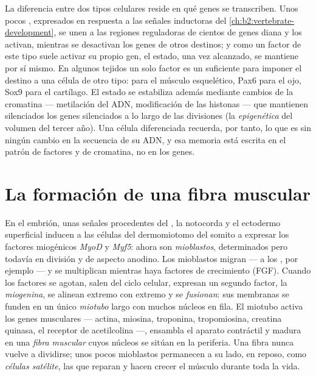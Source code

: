 \begin{proposition}\label{prop:b2:cell-differentiation:transcriptional}
La diferencia entre dos tipos celulares reside en qué genes se
transcriben. Unos pocos \emph{}, expresados en
respuesta a las señales inductoras del
\cref{ch:b2:vertebrate-development}, se unen a las regiones reguladoras de
cientos de genes diana y los activan, mientras se desactivan los genes de
otros destinos; y como un factor de este tipo suele activar su propio gen,
el estado, una vez alcanzado, se mantiene por sí mismo. En algunos tejidos
un solo factor es un \emph{} suficiente para imponer el
destino a una célula de otro tipo:  para el músculo esquelético, Pax6
para el ojo, Sox9 para el cartílago. El estado se estabiliza además
mediante cambios de la cromatina --- metilación del ADN, modificación de
las histonas --- que mantienen silenciados los genes silenciados a lo largo
de las divisiones (la \emph{epigenética} del volumen del tercer año). Una
célula diferenciada recuerda, por tanto, lo que es sin ningún cambio en la
secuencia de su ADN, y esa memoria está escrita en el patrón de factores y
de cromatina, no en los genes.
\end{proposition}

\section{La formación de una fibra muscular}

\begin{definition}[Miogénesis]\label{def:b2:cell-differentiation:myogenesis}
En el embrión, unas señales procedentes del , la notocorda y el
ectodermo superficial inducen a las células del dermomiotomo del somito a
expresar los factores miogénicos \emph{MyoD} y \emph{Myf5}: ahora son
\emph{mioblastos}, determinados pero todavía en división y de aspecto
anodino. Los mioblastos migran --- a los , por
ejemplo --- y se multiplican mientras haya factores de crecimiento (FGF).
Cuando los factores se agotan, salen del ciclo celular, expresan un
segundo factor, la \emph{miogenina}, se alinean extremo con extremo y se
\emph{fusionan}: sus membranas se funden en un único \emph{miotubo} largo
con muchos núcleos en fila. El miotubo activa los genes musculares ---
actina, miosina, troponina, tropomiosina, creatina quinasa, el receptor de
acetilcolina ---, ensambla el aparato contráctil y madura en una
\emph{fibra muscular} cuyos núcleos se sitúan en la periferia. Una fibra
nunca vuelve a dividirse; unos pocos mioblastos permanecen a su lado, en
reposo, como \emph{células satélite}, las  que reparan y hacen
crecer el músculo durante toda la vida.
\end{definition}

